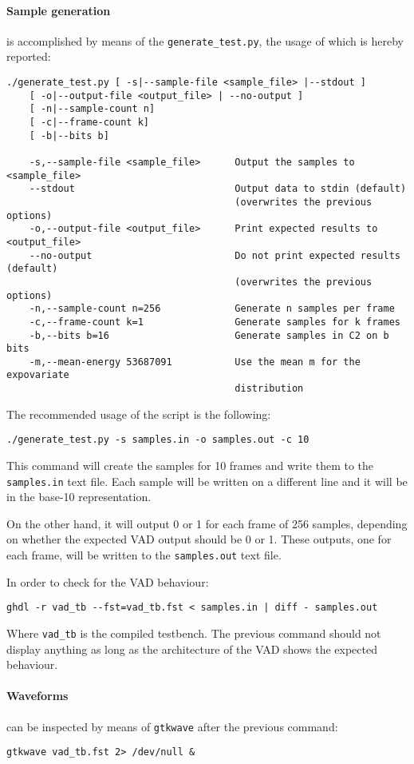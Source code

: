 \paragraph{Sample generation} is accomplished by means of the
\texttt{generate\_test.py}, the usage of which is hereby reported:
{
\footnotesize
\begin{verbatim}
./generate_test.py [ -s|--sample-file <sample_file> |--stdout ]
    [ -o|--output-file <output_file> | --no-output ]
    [ -n|--sample-count n]
    [ -c|--frame-count k]
    [ -b|--bits b]

    -s,--sample-file <sample_file>      Output the samples to <sample_file>
    --stdout                            Output data to stdin (default)
                                        (overwrites the previous options)
    -o,--output-file <output_file>      Print expected results to <output_file>
    --no-output                         Do not print expected results (default)
                                        (overwrites the previous options)
    -n,--sample-count n=256             Generate n samples per frame
    -c,--frame-count k=1                Generate samples for k frames
    -b,--bits b=16                      Generate samples in C2 on b bits
    -m,--mean-energy 53687091           Use the mean m for the expovariate
                                        distribution
\end{verbatim}
}

The recommended usage of the script is the following:
\begin{verbatim}
./generate_test.py -s samples.in -o samples.out -c 10
\end{verbatim}
This command will create the samples for 10 frames and write them to the
\texttt{samples.in} text file. Each sample will be written on a different line
and it will be in the base-10 representation.

On the other hand, it will output 0 or 1 for each frame of 256 samples, depending
on whether the expected VAD output should be 0 or 1. These outputs, one for each
frame, will be written to the \texttt{samples.out} text file.

In order to check for the VAD behaviour:
\begin{verbatim}
ghdl -r vad_tb --fst=vad_tb.fst < samples.in | diff - samples.out
\end{verbatim}
Where \texttt{vad\_tb} is the compiled testbench. The previous command should not
display anything as long as the architecture of the VAD shows the expected
behaviour.

\paragraph{Waveforms} can be inspected by means of \texttt{gtkwave} after
the previous command:
\begin{verbatim}
gtkwave vad_tb.fst 2> /dev/null &
\end{verbatim}
